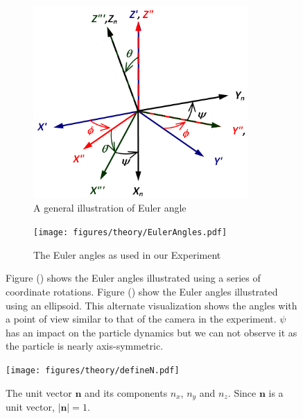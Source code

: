 \begin{figure}[H]
\centering
\begin{subfigure}[b]{0.45\textwidth}
\includegraphics[width=0.9\textwidth]{figures/theory/eulerangles.png}
\caption{A general illustration of Euler angle}
\label{fig:eulerangles}
\end{subfigure}
\begin{subfigure}[b]{0.45\textwidth}
\texttt{[image: figures/theory/EulerAngles.pdf]}
\caption{The Euler angles as used in our Experiment}
\label{fig:eulerparticle}
\end{subfigure}
\caption{Figure () shows the Euler angles illustrated using a series of coordinate rotations. 
Figure () show the Euler angles illustrated using an ellipsoid. This alternate visualization shows the angles with a point of view similar to that of the camera in the experiment. $\psi$ has an impact on the particle dynamics but we can not observe it as the particle is nearly axis-symmetric.}\label{fig:eulerplots}
\end{figure}


\begin{figure}[H]
\begin{center}
\texttt{[image: figures/theory/defineN.pdf]}
\end{center}
\caption{The unit vector $\mathbf{n}$ and its components $n_x$, $n_y$ and $n_z$. Since $\mathbf{n}$ is a unit vector, $|\mathbf{n}| = 1$.}
\label{fig:nDef}
\end{figure}

